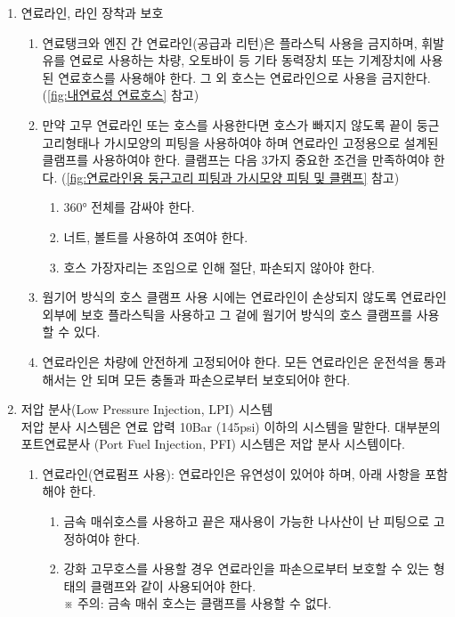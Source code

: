 \documentclass[final,a4paper,10pt]{report}
\begin{document}
\begin{enumerate}
  \item 연료라인, 라인 장착과 보호
    \begin{enumerate}
      \item 연료탱크와 엔진 간 연료라인(공급과 리턴)은 플라스틱 사용을 금지하며, 휘발유를 연료로 사용하는 차량, 오토바이 등 기타 동력장치 또는 기계장치에 사용된 연료호스를 사용해야 한다. 그 외 호스는 연료라인으로 사용을 금지한다. (\cref{fig:내연료성 연료호스} 참고)


      \item 만약 고무 연료라인 또는 호스를 사용한다면 호스가 빠지지 않도록 끝이 둥근 고리형태나 가시모양의 피팅을 사용하여야 하며 연료라인 고정용으로 설계된 클램프를 사용하여야 한다. 클램프는 다음 3가지 중요한 조건을 만족하여야 한다. (\cref{fig:연료라인용 둥근고리 피팅과 가시모양 피팅 및 클램프} 참고)
        \begin{enumerate}
          \item 360° 전체를 감싸야 한다.
          \item 너트, 볼트를 사용하여 조여야 한다.
          \item 호스 가장자리는 조임으로 인해 절단, 파손되지 않아야 한다.
        \end{enumerate}


      \item 웜기어 방식의 호스 클램프 사용 시에는 연료라인이 손상되지 않도록 연료라인 외부에 보호 플라스틱을 사용하고 그 겉에 웜기어 방식의 호스 클램프를 사용할 수 있다.
      \item 연료라인은 차량에 안전하게 고정되어야 한다. 모든 연료라인은 운전석을 통과해서는 안 되며 모든 충돌과 파손으로부터 보호되어야 한다.
    \end{enumerate}
    
  \item 저압 분사(Low Pressure Injection, LPI) 시스템\\
    저압 분사 시스템은 연료 압력 10Bar (145psi) 이하의 시스템을 말한다. 대부분의 포트연료분사 (Port Fuel Injection, PFI) 시스템은 저압 분사 시스템이다.
    
    \begin{enumerate}
      \item 연료라인(연료펌프 사용): 연료라인은 유연성이 있어야 하며, 아래 사항을 포함해야 한다.
        \begin{enumerate}
          \item 금속 매쉬호스를 사용하고 끝은 재사용이 가능한 나사산이 난 피팅으로 고정하여야 한다.
          \item 강화 고무호스를 사용할 경우 연료라인을 파손으로부터 보호할 수 있는 형태의 클램프와 같이 사용되어야 한다.\\
          ※ 주의: 금속 매쉬 호스는 클램프를 사용할 수 없다.
        \end{enumerate}
        

\end{enumerate}
\end{enumerate}
\end{document}
